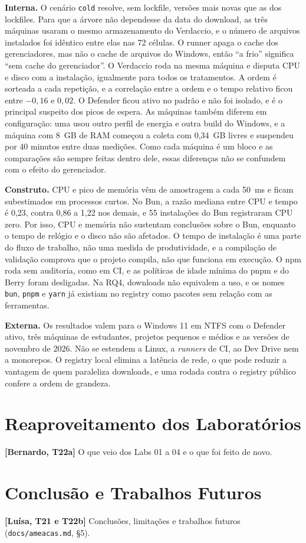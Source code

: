 \documentclass[12pt]{article}
\newcommand{\pendente}[2]{\textcolor{red!70!black}{\textbf{[#1]} #2}}
\begin{document}
\textbf{Interna.} O cenário \texttt{cold} resolve, sem lockfile, versões mais novas que as dos
lockfiles. Para que a árvore não dependesse da data do download, as três máquinas usaram o mesmo
armazenamento do Verdaccio, e o número de arquivos instalados foi idêntico entre elas nas 72
células. O runner apaga o cache dos gerenciadores, mas não o cache de arquivos do Windows, então
``a frio'' significa ``sem cache do gerenciador''. O Verdaccio roda na mesma máquina e disputa CPU e
disco com a instalação, igualmente para todos os tratamentos. A ordem é sorteada a cada repetição, e
a correlação entre a ordem e o tempo relativo ficou entre $-0{,}16$ e $0{,}02$. O Defender ficou
ativo no padrão e não foi isolado, e é o principal suspeito dos picos de espera. As máquinas também
diferem em configuração: uma usou outro perfil de energia e outra build do Windows, e a máquina com
8~GB de RAM começou a coleta com 0,34~GB livres e suspendeu por 40 minutos entre duas medições. Como
cada máquina é um bloco e as comparações são sempre feitas dentro dele, essas diferenças não se
confundem com o efeito do gerenciador.

\textbf{Construto.} CPU e pico de memória vêm de amostragem a cada 50~ms e ficam subestimados em
processos curtos. No Bun, a razão mediana entre CPU e tempo é 0,23, contra 0,86 a 1,22 nos demais,
e 55 instalações do Bun registraram CPU zero. Por isso, CPU e memória não sustentam conclusões sobre
o Bun, enquanto o tempo de relógio e o disco não são afetados. O tempo de instalação é uma parte do
fluxo de trabalho, não uma medida de produtividade, e a compilação de validação comprova que o
projeto compila, não que funciona em execução. O npm roda sem auditoria, como em CI, e as políticas
de idade mínima do pnpm e do Berry foram desligadas. Na RQ4, downloads não equivalem a uso, e os
nomes \texttt{bun}, \texttt{pnpm} e \texttt{yarn} já existiam no registry como pacotes sem relação
com as ferramentas.

\textbf{Externa.} Os resultados valem para o Windows 11 em NTFS com o Defender ativo, três máquinas
de estudantes, projetos pequenos e médios e as versões de novembro de 2026. Não se estendem a
Linux, a \textit{runners} de CI, ao Dev Drive nem a monorepos. O registry local elimina a latência de
rede, o que pode reduzir a vantagem de quem paraleliza downloads, e uma rodada contra o registry
público confere a ordem de grandeza.

\section{Reaproveitamento dos Laboratórios}
\label{sec:reaproveitamento}

\pendente{Bernardo, T22a}{O que veio dos Labs 01 a 04 e o que foi feito de novo.}

\section{Conclusão e Trabalhos Futuros}
\label{sec:conclusao}

\pendente{Luísa, T21 e T22b}{Conclusões, limitações e trabalhos futuros (\texttt{docs/ameacas.md},
§5).}



\end{document}
